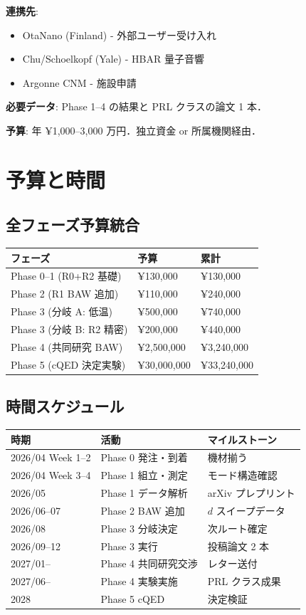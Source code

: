 \documentclass[11pt,a4paper]{article}
\begin{document}
\textbf{連携先}:
\begin{itemize}
\item OtaNano (Finland) - 外部ユーザー受け入れ
\item Chu/Schoelkopf (Yale) - HBAR 量子音響
\item Argonne CNM - 施設申請
\end{itemize}

\textbf{必要データ}: Phase 1--4 の結果と PRL クラスの論文 1 本．

\textbf{予算}: 年 ¥1,000--3,000 万円．独立資金 or 所属機関経由．

\section{予算と時間}

\subsection{全フェーズ予算統合}

\begin{center}
\begin{tabular}{lll}
\toprule
フェーズ & 予算 & 累計 \\
\midrule
Phase 0--1 (R0+R2 基礎) & ¥130,000 & ¥130,000 \\
Phase 2 (R1 BAW 追加) & ¥110,000 & ¥240,000 \\
Phase 3 (分岐 A: 低温) & ¥500,000 & ¥740,000 \\
Phase 3 (分岐 B: R2 精密) & ¥200,000 & ¥440,000 \\
Phase 4 (共同研究 BAW) & ¥2,500,000 & ¥3,240,000 \\
Phase 5 (cQED 決定実験) & ¥30,000,000 & ¥33,240,000 \\
\bottomrule
\end{tabular}
\end{center}

\subsection{時間スケジュール}

\begin{center}
\begin{tabular}{lll}
\toprule
時期 & 活動 & マイルストーン \\
\midrule
2026/04 Week 1--2 & Phase 0 発注・到着 & 機材揃う \\
2026/04 Week 3--4 & Phase 1 組立・測定 & モード構造確認 \\
2026/05 & Phase 1 データ解析 & arXiv プレプリント \\
2026/06--07 & Phase 2 BAW 追加 & $d$ スイープデータ \\
2026/08 & Phase 3 分岐決定 & 次ルート確定 \\
2026/09--12 & Phase 3 実行 & 投稿論文 2 本 \\
2027/01-- & Phase 4 共同研究交渉 & レター送付 \\
2027/06-- & Phase 4 実験実施 & PRL クラス成果 \\
2028 & Phase 5 cQED & 決定検証 \\
\bottomrule
\end{tabular}
\end{center}
\end{document}
